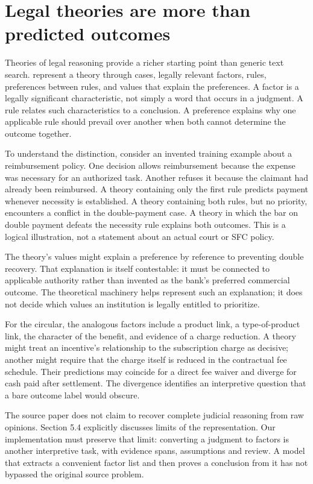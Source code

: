 \documentclass[12pt,a4paper,oneside,openany]{book}
\begin{document}
\section{Legal theories are more than predicted outcomes}

Theories of legal reasoning provide a richer starting point than generic text
search. \citet[sections 3--5]{theories2003} represent a theory through cases,
legally relevant factors, rules, preferences between rules, and values that
explain the preferences. A factor is a legally significant characteristic, not
simply a word that occurs in a judgment. A rule relates such characteristics to a
conclusion. A preference explains why one applicable rule should prevail over
another when both cannot determine the outcome together.

To understand the distinction, consider an invented training example about a
reimbursement policy. One decision allows reimbursement because the expense was
necessary for an authorized task. Another refuses it because the claimant had
already been reimbursed. A theory containing only the first rule predicts payment
whenever necessity is established. A theory containing both rules, but no
priority, encounters a conflict in the double-payment case. A theory in which the
bar on double payment defeats the necessity rule explains both outcomes. This is
a logical illustration, not a statement about an actual court or SFC policy.

The theory's values might explain a preference by reference to preventing double
recovery. That explanation is itself contestable: it must be connected to
applicable authority rather than invented as the bank's preferred commercial
outcome. The theoretical machinery helps represent such an explanation; it does
not decide which values an institution is legally entitled to prioritize.

For the circular, the analogous factors include a product link, a type-of-product
link, the character of the benefit, and evidence of a charge reduction. A theory
might treat an incentive's relationship to the subscription charge as decisive;
another might require that the charge itself is reduced in the contractual fee
schedule. Their predictions may coincide for a direct fee waiver and diverge for
cash paid after settlement. The divergence identifies an interpretive question
that a bare outcome label would obscure.

The source paper does not claim to recover complete judicial reasoning from raw
opinions. Section 5.4 explicitly discusses limits of the representation. Our
implementation must preserve that limit: converting a judgment to factors is
another interpretive task, with evidence spans, assumptions and review. A model
that extracts a convenient factor list and then proves a conclusion from it has
not bypassed the original source problem.
\end{document}
